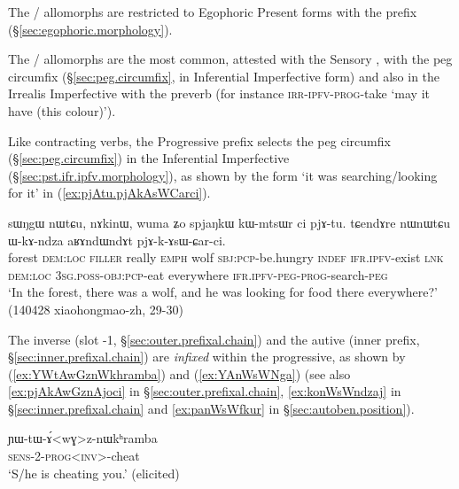 The / allomorphs are restricted to Egophoric Present forms with the prefix  (§\ref{sec:egophoric.morphology}).

The / allomorphs are the most common, attested with the Sensory \hbox{,} with the peg circumfix (§\ref{sec:peg.circumfix}, in Inferential Imperfective form) and also in the Irrealis Imperfective with the preverb  (for instance  \textsc{irr}-\textsc{ipfv}-\textsc{prog}-take `may it have (this colour)').

 Like contracting verbs, the Progressive prefix selects the peg circumfix  (§\ref{sec:peg.circumfix}) in the Inferential Imperfective (§\ref{sec:pst.ifr.ipfv.morphology}), as shown by the form  `it was searching/looking for it' in (\ref{ex:pjAtu.pjAkAsWCarci}).

\begin{exe}
\ex \label{ex:pjAtu.pjAkAsWCarci}
\gll sɯŋgɯ nɯtɕu, nɤkinɯ, wuma ʑo spjaŋkɯ kɯ-mtsɯr ci pjɤ-tu. tɕendɤre nɯnɯtɕu ɯ-kɤ-ndza aʁɤndɯndɤt pjɤ-k-ɤsɯ-ɕar-ci. \\
forest \textsc{dem}:\textsc{loc} \textsc{filler} really \textsc{emph} wolf \textsc{sbj}:\textsc{pcp}-be.hungry \textsc{indef} \textsc{ifr}.\textsc{ipfv}-exist \textsc{lnk} \textsc{dem}:\textsc{loc} \textsc{3sg}.\textsc{poss}-\textsc{obj}:\textsc{pcp}-eat everywhere \textsc{ifr}.\textsc{ipfv}-\textsc{peg}-\textsc{prog}-search-\textsc{peg} \\
\glt `In the forest, there was a wolf, and he was looking for food there everywhere?' (140428 xiaohongmao-zh, 29-30)
\end{exe}

The inverse (slot -1, §\ref{sec:outer.prefixal.chain}) and the autive (inner prefix, §\ref{sec:inner.prefixal.chain}) are \textit{infixed} within the progressive, as shown by (\ref{ex:YWtAwGznWkhramba}) and (\ref{ex:YAnWsWNga})  (see also \ref{ex:pjAkAwGznAjoci} in §\ref{sec:outer.prefixal.chain}, \ref{ex:konWsWndzaj} in §\ref{sec:inner.prefixal.chain} and \ref{ex:panWsWfkur} in §\ref{sec:autoben.position}). 
 
\begin{exe}
\ex \label{ex:YWtAwGznWkhramba}
\gll ɲɯ-tɯ-ɤ́<wɣ>z-nɯkʰramba \\
\textsc{sens}-2-\textsc{prog}<\textsc{inv}>-cheat \\
\glt `S/he is cheating you.' (elicited)
\end{exe} 
 
